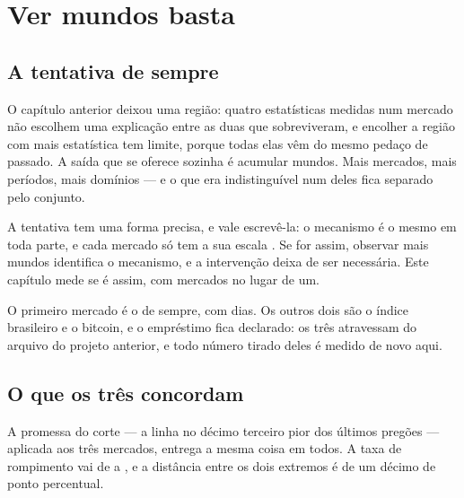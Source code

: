 %
%

\chapter{Ver mundos basta}
\label{cap:observar}

\section{A tentativa de sempre}

O capítulo anterior deixou uma região: quatro estatísticas medidas num mercado não escolhem uma
explicação entre as duas que sobreviveram, e encolher a região com mais estatística tem limite,
porque todas elas vêm do mesmo pedaço de passado. A saída que se oferece sozinha é acumular
mundos. Mais mercados, mais períodos, mais domínios --- e o que era indistinguível num deles fica
separado pelo conjunto.

A tentativa tem uma forma precisa, e vale escrevê-la: o mecanismo é o mesmo em toda parte, e cada
mercado só tem a sua escala \cite{peters2016causal,scholkopf2021causal,ghassami2017learning}. Se for assim, observar mais mundos identifica o mecanismo, e a
intervenção deixa de ser necessária. Este capítulo mede se é assim, com \numObservarMercados{}
mercados no lugar de um.

O primeiro mercado é o de sempre, com \numObservarDiasMaior{} dias. Os outros dois são o índice
brasileiro e o bitcoin, e o empréstimo fica declarado: os três atravessam do arquivo do projeto
anterior, e todo número tirado deles é medido de novo aqui.

\section{O que os três concordam}

A promessa do corte --- a linha no décimo terceiro pior dos últimos
\numCorteJanela{} pregões --- aplicada aos três mercados, entrega a mesma coisa em todos. A taxa
de rompimento vai de \numObservarTaxaMenor{} a \numObservarTaxaMaior{}, e a distância entre os dois
extremos é de um décimo de ponto percentual.

